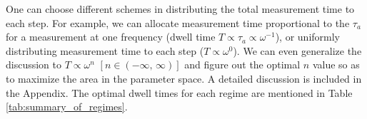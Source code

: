 



One can choose different schemes in distributing the total measurement time to each step. For example, we can allocate measurement time proportional to the $\tau_a$ for a measurement at one frequency (dwell time $T\propto\tau_a\propto\omega^{-1}$), or uniformly distributing measurement time to each step ($T\propto\omega^{0}$). We can even generalize the discussion to $T\propto\omega^{n}$ $[n\in(-\infty,\,\infty)]$ and figure out the optimal $n$ value so as to maximize the area in the parameter space. 
A detailed discussion is included in the Appendix. The optimal dwell times for each regime are mentioned in Table \ref{tab:summary_of_regimes}. 




